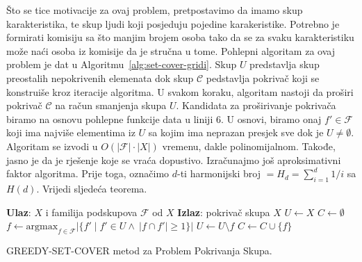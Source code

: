 \documentclass[a4paper, utf8, 11pt, colorlinks]{book}
\begin{document}
Što se tice motivacije za ovaj problem, pretpostavimo da imamo skup karakteristika, te skup ljudi koji posjeduju pojedine karakeristike. Potrebno je formirati komisiju sa što manjim brojem osoba tako da se za svaku karakteristiku može naći osoba iz komisije da je stručna u tome. Pohlepni algoritam za ovaj problem je dat u Algoritmu~\ref{alg:set-cover-gridi}.  %
Skup $U$ predstavlja skup preostalih nepokrivenih elemenata dok skup $\mathcal{C}$ pedstavlja pokrivač koji se konstruiše kroz iteracije algoritma. U svakom koraku, algoritam nastoji da proširi pokrivač $\mathcal{C}$ na račun smanjenja skupa $U$. Kandidata za proširivanje pokrivača biramo na osnovu pohlepne funkcije data u liniji 6. U osnovi, biramo onaj $f' \in \mathcal{F}$ koji ima najviše  elementima iz $U$ sa kojim ima neprazan presjek sve dok je $U \neq \emptyset$. Algoritam se izvodi u $O(|\mathcal{F}| \cdot |X|)$ vremenu, dakle  polinomijalnom. Takođe, jasno je da je rješenje koje se vraća dopustivo. Izračunajmo još aproksimativni faktor algoritma. Prije toga, označimo $d$-ti harmonijski broj $=H_d = \sum_{i=1}^d 1/i$ sa $H(d)$. 
Vrijedi sljedeća teorema.

\begin{algorithm}[!t] 
	\begin{algorithmic}[1]
		\STATE \textbf{Ulaz}: $X$ i familija podskupova $\mathcal{F}$ od $X$
		\STATE \textbf{Izlaz}: pokrivač skupa $X$
		\STATE $U \gets X$
		\STATE $C \gets \emptyset$
		\STATE $f \gets \mbox{argmax}_{f \in \mathcal{F}} |\{ f' \mid f' \in U  \wedge\ |f \cap f'| \geq 1\}| $
		\STATE $U \gets U \setminus f$
		\STATE $C \gets C \cup \{f\}$
		\ENDWHILE
	\end{algorithmic}
	\caption{GREEDY-SET-COVER metod za Problem Pokrivanja Skupa.}
    \label{alg:set-cover-gridi}
\end{algorithm}
\end{document}
